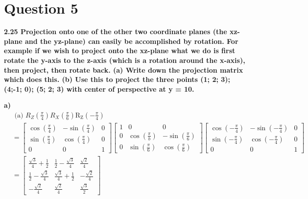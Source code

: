 \documentclass{article}
\begin{document}
\section{Question 5}
\textbf{2.25 Projection onto one of the other two coordinate planes (the xz-
plane and the yz-plane) can easily be accomplished by rotation. For example if
we wish to project onto the xz-plane what we do is first rotate the y-axis to the
z-axis (which is a rotation around the x-axis), then project, then rotate back.
(a) Write down the projection matrix which does this.
(b) Use this to project the three points
(1; 2; 3); (4;-1; 0); (5; 2; 3)
with center of perspective at y = 10.}

\textbf{a)}
\begin{equation}
\begin{aligned}
&\text { (a) } R_Z\left(\frac{\pi}{4}\right) R_X\left(\frac{\pi}{6}\right) \operatorname{R_Z}\left(-\frac{\pi}{4}\right)\\
&=\left[\begin{array}{ccc}
\cos \left(\frac{\pi}{4}\right) & -\sin \left(\frac{\pi}{4}\right) & 0 \\
\sin \left(\frac{\pi}{4}\right) & \cos \left(\frac{\pi}{4}\right) & 0 \\
0 & 0 & 1
\end{array}\right]\left[\begin{array}{ccc}
1 & 0 & 0 \\
0 & \cos \left(\frac{\pi}{b}\right) & -\sin \left(\frac{\pi}{6}\right) \\
0 & \sin \left(\frac{\pi}{6}\right) & \cos \left(\frac{\pi}{6}\right)
\end{array}\right]\left[\begin{array}{ccc}
\cos \left(-\frac{\pi}{4}\right) & -\sin \left(-\frac{\pi}{4}\right) & 0\\
\sin \left(-\frac{\pi}{4}\right) & \cos \left(-\frac{\pi}{4}\right) & 0 \\
0 & 0 & 1
\end{array}\right]\\
&=\left[\begin{array}{ccc}
\frac{\sqrt{3}}{4}+\frac{1}{2} & \frac{1}{2}-\frac{\sqrt{3}}{4} & \frac{\sqrt{2}}{4} \\
\frac{1}{2}-\frac{\sqrt{3}}{4} & \frac{\sqrt{3}}{4}+\frac{1}{2} & -\frac{\sqrt{2}}{4} \\
-\frac{\sqrt{2}}{4} & \frac{\sqrt{2}}{4} & \frac{\sqrt{3}}{2}
\end{array}\right]
\end{aligned}
\end{equation}
\end{document}
